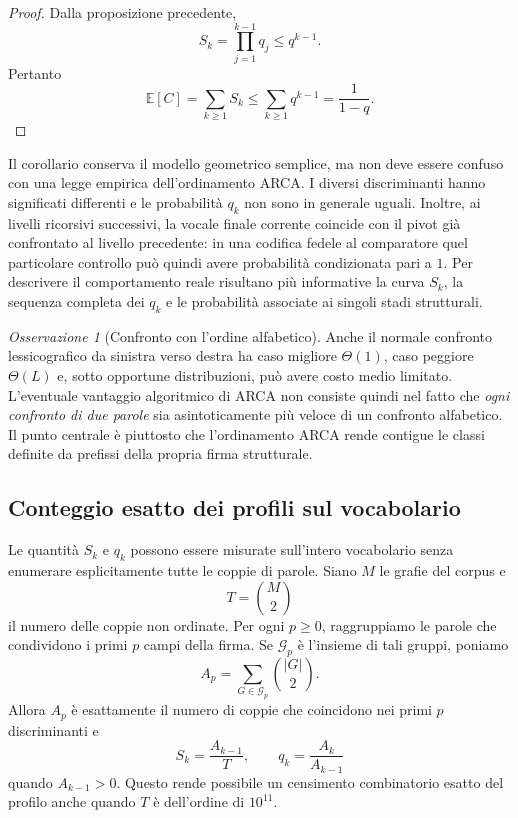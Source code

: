 \documentclass[11pt,a4paper]{article}
\theoremstyle{definition}
\theoremstyle{remark}
\newtheorem{osservazione}[teorema]{Osservazione}
\begin{document}
\begin{proof}
Dalla proposizione precedente,
\[
  S_k=\prod_{j=1}^{k-1}q_j\leq q^{k-1}.
\]
Pertanto
\[
  \mathbb{E}[C]
  =\sum_{k\geq1}S_k
  \leq\sum_{k\geq1}q^{k-1}
  =\frac{1}{1-q}.
\]
\end{proof}

Il corollario conserva il modello geometrico semplice, ma non deve essere confuso con una legge empirica dell'ordinamento ARCA. I diversi discriminanti hanno significati differenti e le probabilità $q_k$ non sono in generale uguali. Inoltre, ai livelli ricorsivi successivi, la vocale finale corrente coincide con il pivot già confrontato al livello precedente: in una codifica fedele al comparatore quel particolare controllo può quindi avere probabilità condizionata pari a $1$. Per descrivere il comportamento reale risultano più informative la curva $S_k$, la sequenza completa dei $q_k$ e le probabilità associate ai singoli stadi strutturali.

\begin{osservazione}[Confronto con l'ordine alfabetico]
Anche il normale confronto lessicografico da sinistra verso destra ha caso migliore $\Theta(1)$, caso peggiore $\Theta(L)$ e, sotto opportune distribuzioni, può avere costo medio limitato. L'eventuale vantaggio algoritmico di ARCA non consiste quindi nel fatto che \emph{ogni confronto di due parole} sia asintoticamente più veloce di un confronto alfabetico. Il punto centrale è piuttosto che l'ordinamento ARCA rende contigue le classi definite da prefissi della propria firma strutturale.
\end{osservazione}

\subsection{Conteggio esatto dei profili sul vocabolario}

Le quantità $S_k$ e $q_k$ possono essere misurate sull'intero vocabolario senza enumerare esplicitamente tutte le coppie di parole. Siano $M$ le grafie del corpus e
\[
  T=\binom{M}{2}
\]
il numero delle coppie non ordinate. Per ogni $p\geq0$, raggruppiamo le parole che condividono i primi $p$ campi della firma. Se $\mathcal{G}_p$ è l'insieme di tali gruppi, poniamo
\[
  A_p=\sum_{G\in\mathcal{G}_p}\binom{|G|}{2}.
\]
Allora $A_p$ è esattamente il numero di coppie che coincidono nei primi $p$ discriminanti e
\[
  S_k=\frac{A_{k-1}}{T},
  \qquad
  q_k=\frac{A_k}{A_{k-1}}
\]
quando $A_{k-1}>0$. Questo rende possibile un censimento combinatorio esatto del profilo anche quando $T$ è dell'ordine di $10^{11}$.
\end{document}
